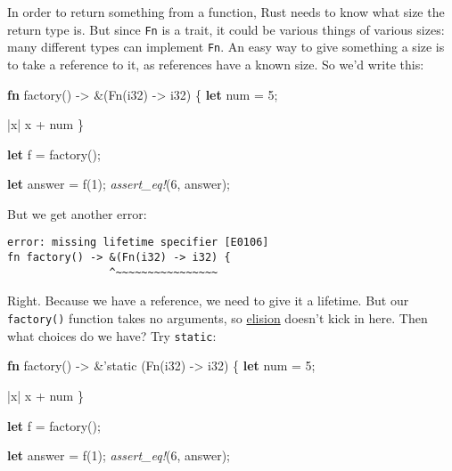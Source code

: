 \documentclass[a4paper,]{book}
\newenvironment{Shaded}{\begin{snugshade}}{\end{snugshade}}
\newcommand{\KeywordTok}[1]{\textcolor[rgb]{0.13,0.29,0.53}{\textbf{{#1}}}}
\newcommand{\DataTypeTok}[1]{\textcolor[rgb]{0.13,0.29,0.53}{{#1}}}
\newcommand{\DecValTok}[1]{\textcolor[rgb]{0.00,0.00,0.81}{{#1}}}
\newcommand{\OtherTok}[1]{\textcolor[rgb]{0.56,0.35,0.01}{{#1}}}
\newcommand{\BuiltInTok}[1]{{#1}}
\newcommand{\PreprocessorTok}[1]{\textcolor[rgb]{0.56,0.35,0.01}{\textit{{#1}}}}
\newcommand{\NormalTok}[1]{{#1}}
\begin{document}
In order to return something from a function, Rust needs to know what
size the return type is. But since \texttt{Fn} is a trait, it could be
various things of various sizes: many different types can implement
\texttt{Fn}. An easy way to give something a size is to take a reference
to it, as references have a known size. So we'd write this:

\begin{Shaded}
\begin{Highlighting}[]
\KeywordTok{fn} \NormalTok{factory() -> &(}\BuiltInTok{Fn}\NormalTok{(}\DataTypeTok{i32}\NormalTok{) -> }\DataTypeTok{i32}\NormalTok{) \{}
    \KeywordTok{let} \NormalTok{num = }\DecValTok{5}\NormalTok{;}

    \NormalTok{|x| x + num}
\NormalTok{\}}

\KeywordTok{let} \NormalTok{f = factory();}

\KeywordTok{let} \NormalTok{answer = f(}\DecValTok{1}\NormalTok{);}
\PreprocessorTok{assert_eq!}\NormalTok{(}\DecValTok{6}\NormalTok{, answer);}
\end{Highlighting}
\end{Shaded}

But we get another error:

\begin{verbatim}
error: missing lifetime specifier [E0106]
fn factory() -> &(Fn(i32) -> i32) {
                ^~~~~~~~~~~~~~~~~
\end{verbatim}

Right. Because we have a reference, we need to give it a lifetime. But
our \texttt{factory()} function takes no arguments, so
\protect\hyperlink{lifetime-elision}{elision} doesn't kick in here. Then
what choices do we have? Try \texttt{\textquotesingle{}static}:

\begin{Shaded}
\begin{Highlighting}[]
\KeywordTok{fn} \NormalTok{factory() -> &}\OtherTok{'static} \NormalTok{(}\BuiltInTok{Fn}\NormalTok{(}\DataTypeTok{i32}\NormalTok{) -> }\DataTypeTok{i32}\NormalTok{) \{}
    \KeywordTok{let} \NormalTok{num = }\DecValTok{5}\NormalTok{;}

    \NormalTok{|x| x + num}
\NormalTok{\}}

\KeywordTok{let} \NormalTok{f = factory();}

\KeywordTok{let} \NormalTok{answer = f(}\DecValTok{1}\NormalTok{);}
\PreprocessorTok{assert_eq!}\NormalTok{(}\DecValTok{6}\NormalTok{, answer);}
\end{Highlighting}
\end{Shaded}
\end{document}
